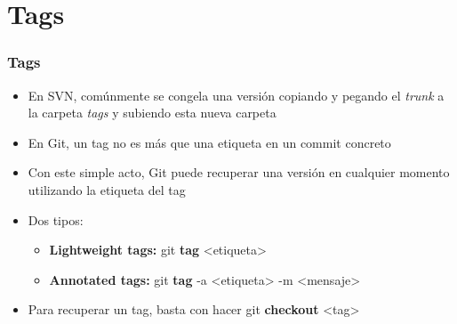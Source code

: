 \section{Tags}
\frame
{
\frametitle{Tags}
\begin{itemize}
 \item En SVN, comúnmente se congela una versión copiando y pegando el \textit{trunk} a la carpeta \textit{tags} y subiendo esta nueva carpeta
 \item En Git, un tag no es más que una etiqueta en un commit concreto
 \item Con este simple acto, Git puede recuperar una versión en cualquier momento utilizando la etiqueta del tag
 \item Dos tipos:
 \begin{itemize}
  \item \textbf{Lightweight tags:} git \textbf{tag} <etiqueta>
  \item \textbf{Annotated tags:} git \textbf{tag} -a <etiqueta> -m <mensaje>
 \end{itemize}
 \item Para recuperar un tag, basta con hacer git \textbf{checkout} <tag>

\end{itemize}
}
